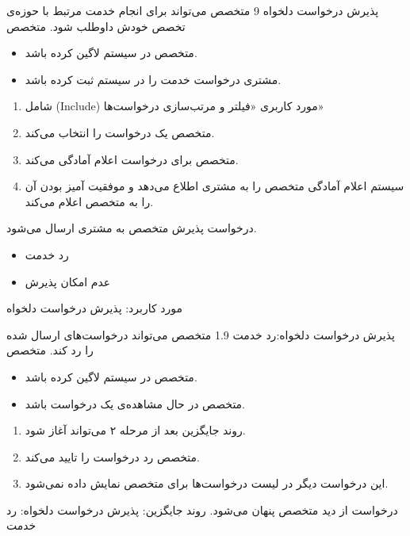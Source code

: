 {
\usecase
{پذیرش درخواست دلخواه}
{9}
{متخصص می‌تواند برای انجام خدمت مرتبط با حوزه‌ی تخصص خودش داوطلب شود.}
{متخصص}
{}
{	
	\begin{itemize}
		\vspace*{-0.6cm}
		\item 
		متخصص در سیستم لاگین کرده باشد.
		\item
		مشتری درخواست خدمت را در سیستم ثبت کرده باشد.
	\end{itemize}
}
{
	\vspace*{-0.6cm}
	\begin{enumerate}
		\item 
		شامل (Include) مورد کاربری «فیلتر و مرتب‌سازی درخواست‌ها»
		\item
		متخصص یک درخواست را انتخاب می‌کند.
		\item
		متخصص برای درخواست اعلام آمادگی می‌کند.
		
		\item
		سیستم اعلام آمادگی متخصص را به مشتری اطلاع می‌دهد و موفقیت آمیز بودن آن را به متخصص اعلام می‌کند.
	\end{enumerate}
}
{درخواست پذیرش متخصص به مشتری ارسال می‌شود.}
{
	\begin{itemize}
		\vspace*{-0.6cm}
		\item
		رد خدمت
		\item
		 عدم امکان پذیرش
	\end{itemize}
}
{
	مورد کاربرد: پذیرش درخواست دلخواه
}

\alternativeflow
{
	 پذیرش درخواست دلخواه:رد خدمت
}
{1.9}
{
	متخصص می‌تواند درخواست‌های ارسال شده را رد کند.
}
{
	متخصص
}
{}
{
	\begin{itemize}
		\vspace*{-0.6cm}
		\item 
		متخصص در سیستم لاگین کرده باشد.
		\item
		متخصص در حال مشاهده‌ی یک درخواست باشد.
	\end{itemize}
}
{
	\vspace*{-0.6cm}
	\begin{enumerate}
		\item 
		روند جایگزین بعد از مرحله ۲ می‌‌تواند آغاز شود.
		
		\item
		متخصص رد درخواست را تایید می‌کند.
		\item
		این درخواست دیگر در لیست درخواست‌ها برای متخصص نمایش داده نمی‌شود.
	\end{enumerate}
}
{
	درخواست از دید متخصص پنهان می‌شود.
}
{
روند جایگزین: پذیرش درخواست دلخواه: رد خدمت
}

}
